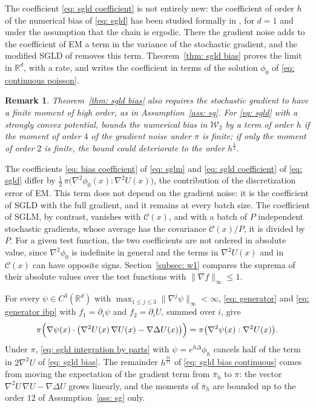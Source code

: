 \documentclass{article}
\newtheorem{remark}{Remark}
\newcommand{\Le}{\leqslant}
\newcommand{\norm}[1]{\lVert #1 \rVert}
\numberwithin{equation}{section}
\begin{document}
The coefficient \eqref{eq: sgld coefficient} is not entirely new: the coefficient of order $h$ of the numerical bias of \eqref{eq: sgld} has been studied formally in \citep[Section~4.1]{vollmer2016exploration}, for $d = 1$ and under the assumption that the chain is ergodic. There the gradient noise adds to the coefficient of EM a term in the variance of the stochastic gradient, and the modified SGLD of \citep[Section~4.2]{vollmer2016exploration} removes this term. Theorem~\ref{thm: sgld bias} proves the limit in $\mathbb R^d$, with a rate, and writes the coefficient in terms of the solution $\phi_0$ of \eqref{eq: continuous poisson}.

\begin{remark}
Theorem~\ref{thm: sgld bias} also requires the stochastic gradient to have a finite moment of high order, as in Assumption~\ref{ass: sg}. For \eqref{eq: sgld} with a strongly convex potential, \citep[Theorem~1]{paulin2026sgld} bounds the numerical bias in $\mathcal W_2$ by a term of order $h$ if the moment of order $4$ of the gradient noise under $\pi$ is finite; if only the moment of order $2$ is finite, the bound could deteriorate to the order $h^{\frac12}$.
\end{remark}

The coefficients \eqref{eq: bias coefficient} of \eqref{eq: sglm} and \eqref{eq: sgld coefficient} of \eqref{eq: sgld} differ by $\frac12\, \pi\bigl( \nabla^2 \phi_0(x) : \nabla^2 U(x) \bigr)$, the contribution of the discretization error of EM. This term does not depend on the gradient noise: it is the coefficient of SGLD with the full gradient, and it remains at every batch size. The coefficient of SGLM, by contrast, vanishes with $\mathcal C(x)$, and with a batch of $P$ independent stochastic gradients, whose average has the covariance $\mathcal C(x)/P$, it is divided by $P$. For a given test function, the two coefficients are not ordered in absolute value, since $\nabla^2 \phi_0$ is indefinite in general and the terms in $\nabla^2 U(x)$ and in $\mathcal C(x)$ can have opposite signs. Section~\ref{subsec: w1} compares the suprema of their absolute values over the test functions with $\norm{\nabla f}_\infty \Le 1$.

For every $\psi \in C^3(\mathbb R^d)$ with $\max_{1 \Le j \Le 3} \norm{\nabla^j \psi}_\infty < \infty$, \eqref{eq: generator} and \eqref{eq: generator ibp} with $f_1 = \partial_i \psi$ and $f_2 = \partial_i U$, summed over $i$, give
\begin{equation}
    \pi\Bigl( \nabla \psi(x) \cdot \bigl( \nabla^2 U(x)\, \nabla U(x) - \nabla \Delta U(x) \bigr) \Bigr) = \pi\bigl( \nabla^2 \psi(x) : \nabla^2 U(x) \bigr) .
    \label{eq: sgld integration by parts}
\end{equation}
Under $\pi$, \eqref{eq: sgld integration by parts} with $\psi = e^{h\Delta} \phi_h$ cancels half of the term in $2 \nabla^2 U$ of \eqref{eq: sgld bias}. The remainder $h^{\frac{21}{11}}$ of \eqref{eq: sgld bias continuous} comes from moving the expectation of the gradient term from $\bar\pi_h$ to $\pi$: the vector $\nabla^2 U\, \nabla U - \nabla \Delta U$ grows linearly, and the moments of $\bar\pi_h$ are bounded up to the order $12$ of Assumption~\ref{ass: sg} only.
\end{document}
